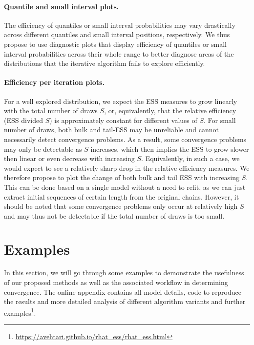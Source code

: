 \documentclass[american,]{article}
\let\oldparagraph\paragraph
\renewcommand{\paragraph}[1]{\oldparagraph{#1}\mbox{}}
\let\rmarkdownfootnote\footnote%
\def\footnote{\protect\rmarkdownfootnote}
\begin{document}
\hypertarget{quantile-and-small-interval-plots}{%
\paragraph{Quantile and small interval
plots.}\label{quantile-and-small-interval-plots}}
The efficiency of quantiles or small interval probabilities may vary
drastically across different quantiles and small interval positions,
respectively. We thus propose to use diagnostic plots that display
efficiency of quantiles or small interval probabilities across their
whole range to better diagnose areas of the distributions that the
iterative algorithm fails to explore efficiently.

\hypertarget{efficiency-change-plots}{%
\paragraph{Efficiency per iteration plots.}\label{efficiency-change-plots}}
For a well explored distribution, we expect the ESS measures to grow
linearly with the total number of draws \(S\), or, equivalently, that
the relative efficiency (ESS divided \(S\)) is approximately constant
for different values of \(S\). For small number of draws, both bulk and
tail-ESS may be unreliable and cannot necessarily detect convergence
problems. As a result, some convergence problems may only be
detectable as \(S\) increases, which then implies the ESS to grow slower
then linear or even decrease with increasing \(S\). Equivalently, in
such a case, we would expect to see a relatively sharp drop in the
relative efficiency measures. We therefore propose to plot the change of
both bulk and tail ESS with increasing \(S\). This can be done based on
a single model without a need to refit, as we can just extract initial
sequences of certain length from the original chains. However, it should
be noted that some convergence problems only occur at relatively high
\(S\) and may thus not be detectable if the total number of draws is too
small.

\hypertarget{examples}{%
\section{Examples}\label{examples}}

In this section, we will go through some examples to demonstrate the
usefulness of our proposed methods as well as the associated workflow
in determining convergence. The online appendix contains all model
details, code to reproduce the results and more detailed analysis of
different algorithm variants and further
examples\footnote{\url{https://avehtari.github.io/rhat_ess/rhat_ess.html}}.
\end{document}
